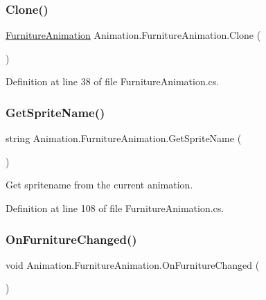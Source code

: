 \subsubsection{\texorpdfstring{Clone()}{Clone()}}
{\footnotesize\ttfamily \hyperlink{class_animation_1_1_furniture_animation}{Furniture\+Animation} Animation.\+Furniture\+Animation.\+Clone (\begin{DoxyParamCaption}{ }\end{DoxyParamCaption})}



Definition at line 38 of file Furniture\+Animation.\+cs.

\mbox{\label{class_animation_1_1_furniture_animation_acf54feda77dce0a14221775080c22299}} 
\subsubsection{\texorpdfstring{Get\+Sprite\+Name()}{GetSpriteName()}}
{\footnotesize\ttfamily string Animation.\+Furniture\+Animation.\+Get\+Sprite\+Name (\begin{DoxyParamCaption}{ }\end{DoxyParamCaption})}



Get spritename from the current animation. 



Definition at line 108 of file Furniture\+Animation.\+cs.

\mbox{\label{class_animation_1_1_furniture_animation_a018343ba77e8f7e0a1cb49945984fb4e}} 
\subsubsection{\texorpdfstring{On\+Furniture\+Changed()}{OnFurnitureChanged()}}
{\footnotesize\ttfamily void Animation.\+Furniture\+Animation.\+On\+Furniture\+Changed (\begin{DoxyParamCaption}{ }\end{DoxyParamCaption})}



